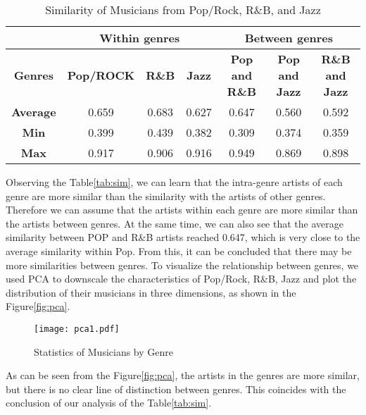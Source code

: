 \documentclass[12pt]{article}  %
\begin{document}
\vspace{-0.5cm}
\begin{table}[htbp]
	\centering
	\caption{Similarity of Musicians from Pop/Rock, R\&B, and Jazz}\label{tab:sim}
	\begin{tabular}{c|c|c|c|c|c|c}
		\hline
		\hline
		& \multicolumn{3}{c|}{\textbf{Within genres}}                       & \multicolumn{3}{c}{\textbf{Between genres}} \\
		\hline
		\hline
		\textbf{Genres}      & \textbf{Pop/ROCK}    & \textbf{R\&B}        & \textbf{Jazz}        & \textbf{Pop and R\&B} & \textbf{Pop and Jazz} & \textbf{R\&B and Jazz} \\
		\hline
		\textbf{Average}     & 0.659                & 0.683                & 0.627                & 0.647                & 0.560                 & 0.592 \\
		\hline
		\textbf{Min}         & 0.399                & 0.439                & 0.382                & 0.309                & 0.374                & 0.359 \\
		\hline
		\textbf{Max}         & 0.917                & 0.906                & 0.916                & 0.949                & 0.869                & 0.898 \\
		\hline
		\hline
	\end{tabular}%
\end{table}%

Observing the Table\eqref{tab:sim}, we can learn that the intra-genre artists of each genre are more similar than the similarity with the artists of other genres. Therefore we can assume that the artists within each genre are more similar than the artists between genres. At the same time, we can also see that the average similarity between POP and R\&B artists reached 0.647, which is very close to the average similarity within Pop. From this, it can be concluded that there may be more similarities between genres. To visualize the relationship between genres, we used PCA to downscale the characteristics of Pop/Rock, R\&B, Jazz and plot the distribution of their musicians in three dimensions, as shown in the Figure\eqref{fig:pca}.

\begin{figure}[htbp]
	\centering
	\texttt{[image: pca1.pdf]}
	\caption{Statistics of Musicians by Genre}\label{fig:pca}
\end{figure}

As can be seen from the Figure\eqref{fig:pca}, the artists in the genres are more similar, but there is no clear line of distinction between genres. This coincides with the conclusion of our analysis of the Table\eqref{tab:sim}.
\end{document}
